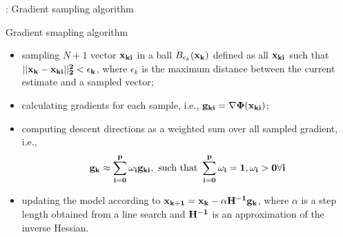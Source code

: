 

\begin{frame}[c]{\titleprefix: Gradient sampling algorithm}

  \centering

  \begin{minipage}{0.3\textwidth}
  \end{minipage}
  \hspace{1 cm}
  \begin{minipage}{0.5\textwidth}
    \tiny
    \begin{figureblock}{Gradient smapling algorithm}
      \begin{itemize}
        \tiny
        \item sampling $N + 1$ vector $\bf x_{ki}$ in a ball
          $B_{\epsilon_k} (\bf x_k)$ defined as all $\bf x_{ki}$ such that
          $|| \bf x_k - \bf x_{ki} ||^2_2 < \epsilon_k$,
          where $\epsilon_k$ is the maximum distance between the current
          estimate and a sampled vector;
        \item calculating gradients for each sample, i.e.,
          $\bf g_{ki} = \nabla \Phi (\bf x_{ki})$;
        \item computing descent directions as a weighted sum over all sampled
          gradient, i.e.,
          \[ \bf g_k \approx \sum_{i = 0}^p \omega_i \bf g_{ki},
             \text{ such that } \sum_{i = 0}^p \omega_i = 1,
             \omega_i > 0 \forall i \]
        \item updating the model according to $\bf x_{k + 1} = \bf x_k - \alpha
          \bf H^{ - 1} \bf g_k$, where $\alpha$ is a step length
          obtained from a line search and $\bf H^{ - 1}$ is an approximation
          of the inverse Hessian.
      \end{itemize}
    \end{figureblock}
  \end{minipage}

\end{frame}
